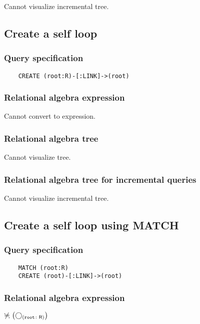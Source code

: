 	Cannot visualize incremental tree.
	\subsection{Create a self loop}

	\subsubsection*{Query specification}

	\begin{lstlisting}
	CREATE (root:R)-[:LINK]->(root)
	\end{lstlisting}


	\subsubsection*{Relational algebra expression}

	Cannot convert to expression.

	\subsubsection*{Relational algebra tree}

	Cannot visualize tree.

	\subsubsection*{Relational algebra tree for incremental queries}

	Cannot visualize incremental tree.
	\subsection{Create a self loop using MATCH}

	\subsubsection*{Query specification}

	\begin{lstlisting}
	MATCH (root:R)
	CREATE (root)-[:LINK]->(root)
	\end{lstlisting}


	\subsubsection*{Relational algebra expression}

	$\alldifferent{} \left(\getvertices{root}{R}\right)$

